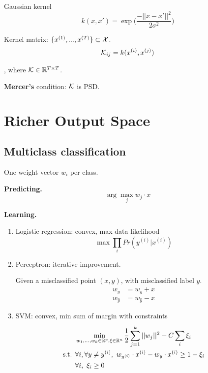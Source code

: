 \documentclass[a4paper]{report}
\begin{document}
Gaussian kernel
$$
k(x, x') = \exp\Big(\frac{-||x-x'||^2}{2\sigma^2}\Big)
$$


Kernel matrix: $\{x^{(1)},...,x^{(T)}\}\subset \mathcal{X}$. 
$$
\mathcal{K}_{ij} = k(x^{(i)}, x^{(j)}) 
$$

, where $\mathcal{K}\in \mathbb{R}^{T\times T}$.

\textbf{Mercer's} condition: $\mathcal{K}$ is PSD.

\chapter{Richer Output Space} 
\section{Multiclass classification}
One weight vector $w_i$ per class. 

\textbf{Predicting.} 
$$
\arg\max_j w_j \cdot x
$$

\textbf{Learning.}
\begin{enumerate}
\item Logistic regression: convex, max data likelihood
$$
\max \prod_i Pr(y^{(i)}|x^{(i)})
$$
\item Perceptron: iterative improvement.

Given a misclassified point $(x, y)$, with misclassified label $\hat y$.
\begin{align*}
w_y &= w_y + x \\
w_{\hat y} &= w_{\hat y} - x
\end{align*}
\item SVM: convex, min sum of margin with constraints
\begin{align*}
&\min_{w_1, ..., w_k \in \mathbb{R}^p, \xi\in \mathbb{R}^n} \frac{1}{2}\sum_{j=1}^k ||w_j||^2+C\sum_i \xi_i \\
\text{s.t. } &\forall i, \forall y \neq y^{(i)},~ w_{y^{(i)}}\cdot x^{(i)} - w_y \cdot x^{(i)} \geq 1-\xi_i \\
& \forall i,~ \xi_i\geq0
\end{align*}
\end{enumerate}
\end{document}
